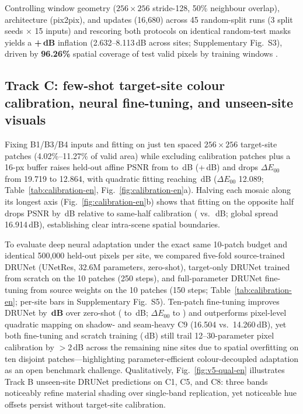 \documentclass[a4paper,10pt]{article}
\newcommand{\dE}{\ensuremath{\Delta E_{00}}}
\begin{document}
Controlling window geometry ($256\times256$ stride-128, 50\% neighbour overlap), architecture (pix2pix), and updates (16,680) across 45 random-split runs (3 split seeds $\times$ 15 inputs) and rescoring both protocols on identical random-test masks yields a \textbf{+\ProtocolGain\,dB} inflation (2.632--8.113\,dB across sites; Supplementary Fig.~S3), driven by \textbf{96.26\%} spatial coverage of test valid pixels by training windows \cite{roberts2017,kapoor2023}.

\subsection{Track C: few-shot target-site colour calibration, neural fine-tuning, and unseen-site visuals}\label{sec:calibration-en}\label{sec:qualitative-en}
Fixing B1/B3/B4 inputs and fitting on just ten spaced $256\times256$ target-site patches (4.02\%--11.27\% of valid area) while excluding calibration patches plus a 16-px buffer raises held-out affine PSNR from \CalibrationCross{} to \CalibrationTarget\,dB (+\CalibrationAffineGain\,dB) and drops \dE{} from 19.719 to 12.864, with quadratic fitting reaching \CalibrationQuad\,dB (\dE{} 12.089; Table~\ref{tab:calibration-en}, Fig.~\ref{fig:calibration-en}a). Halving each mosaic along its longest axis (Fig.~\ref{fig:calibration-en}b) shows that fitting on the opposite half drops PSNR by \HalfDrop\,dB relative to same-half calibration (\HalfCross{} vs.\ \HalfWithin\,dB; global spread 16.914\,dB), establishing clear intra-scene spatial boundaries.

To evaluate deep neural adaptation under the exact same 10-patch budget and identical 500,000 held-out pixels per site, we compared five-fold source-trained DRUNet (UNetRes, 32.6M parameters, zero-shot), target-only DRUNet trained from scratch on the 10 patches (250 steps), and full-parameter DRUNet fine-tuning from source weights on the 10 patches (150 steps; Table~\ref{tab:calibration-en}; per-site bars in Supplementary Fig.~S5). Ten-patch fine-tuning improves DRUNet by \textbf{\TrackCDrFtGainZs\,dB} over zero-shot (\TrackCDrZsPsnr{} to \TrackCDrFtPsnr\,dB; \dE{} \TrackCDrZsDe{} to \TrackCDrFtDe) and outperforms pixel-level quadratic mapping on shadow- and seam-heavy C9 (16.504 vs.\ 14.260\,dB), yet both fine-tuning and scratch training (\TrackCDrScPsnr\,dB) still trail 12--30-parameter pixel calibration by $>$2\,dB across the remaining nine sites due to spatial overfitting on ten disjoint patches—highlighting parameter-efficient colour-decoupled adaptation as an open benchmark challenge. Qualitatively, Fig.~\ref{fig:v5-qual-en} illustrates Track B unseen-site DRUNet predictions on C1, C5, and C8: three bands noticeably refine material shading over single-band replication, yet noticeable hue offsets persist without target-site calibration.
\end{document}
